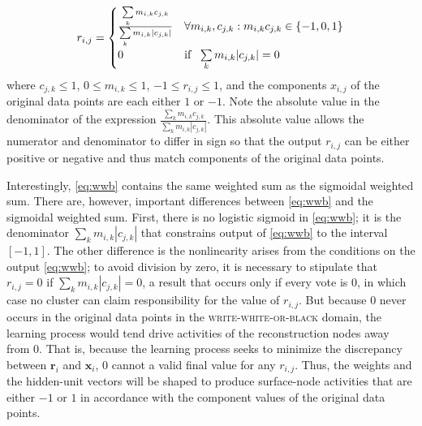  \begin{align}\label{eq:wwb}
  r_{i,j} &=
    \begin{cases}
      \frac{\sum\limits_{k} m_{i,k} c_{j,k}}{\sum\limits_{k} m_{i,k} |c_{j,k}|} & \text{$\forall m_{i,k}, c_{j,k} : m_{i,k} c_{j,k} \in \{-1,0,1\} $}\\
      0 & \text{if \, $\sum\limits_{k} m_{i,k} |c_{j,k}|= 0$}\\
    \end{cases} \\
 \end{align}
where $c_{j,k} \leq 1$, $0 \leq  m_{i,k} \leq  1$,  $-1 \leq  r_{i,j} \leq  1$, and the components $x_{i,j}$ of the original data points
are each either $1$ or  $-1$. Note the absolute value in the denominator of the expression $\frac{\sum_{k} m_{i,k} c_{j,k}}{\sum_{k} m_{i,k} |c_{j,k}|}$. This absolute value allows the numerator and denominator to differ in sign so that the output $r_{i,j}$ can be either positive or negative and thus match components of the original data points.

 Interestingly, \eqref{eq:wwb} contains the same weighted sum as the sigmoidal weighted sum. There are, however, important differences between \eqref{eq:wwb} and the sigmoidal weighted sum. First, there is no logistic sigmoid in \eqref{eq:wwb}; it is the denominator $\sum_{k} m_{i,k} |c_{j,k}|$ that constrains output of \eqref{eq:wwb} to the interval $[-1,1]$. The other difference is the nonlinearity arises from the conditions on the output \eqref{eq:wwb}; to avoid division by zero, it is necessary to stipulate that $r_{i,j}=0$ if $\sum_{k} m_{i,k} |c_{j,k}| = 0$, a result that occurs only if every vote is 0, in which case no cluster can claim responsibility for the value of $r_{i,j}$. But because $0$ never occurs in the original data points in the \textsc{write-white-or-black} domain, the learning process would tend drive activities of the reconstruction nodes away from $0$. That is, because the learning process seeks to minimize the discrepancy between $\textbf{r}_i$ and $\textbf{x}_i$, $0$ cannot a valid final value for any $r_{i,j}$.  Thus, the weights and the hidden-unit vectors will be shaped to produce surface-node activities that are either $-1$ or $1$ in accordance with the component values of the original data points. 

